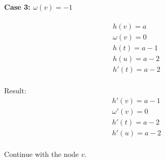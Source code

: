 \paragraph*{\textbf{Case 3}: $\omega(v) = -1$}
\[
\begin{split}
& h(v) = a \\
& \omega(v) = 0 \\
& h(t) = a - 1 \\
& h(u) = a - 2 \\
& h'(t) = a - 2 \\
\end{split}
\]

Result:
\[
\begin{split}
& h'(v) = a - 1 \\
& \omega'(v) = 0 \\
& h'(t) = a - 2 \\
& h'(u) = a - 2 \\
\end{split}
\]

Continue with the node $v$.